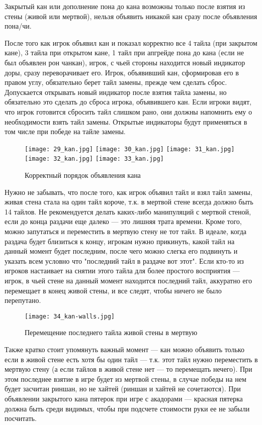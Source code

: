 Закрытый кан или дополнение пона до кана возможны только после взятия из стены (живой или мертвой), нельзя объявить никакой кан сразу после объявления пона/чи.

После того как игрок объявил кан и показал корректно все 4 тайла (при закрытом кане), 3 тайла при открытом кане, 1 тайл при апгрейде пона до кана (если не был объявлен рон чанкан), игрок, с чьей стороны находится новый индикатор доры, сразу переворачивает его. Игрок, объявивший кан, сформировав его в правом углу, обязательно берет тайл замены, прежде чем сделать сброс. Допускается открывать новый индикатор после взятия тайла замены, но обязательно это сделать до сброса игрока, объявившего кан. Если игроки видят, что игрок готовится сбросить тайл слишком рано, они должны напомнить ему о необходимости взять тайл замены. Открытые индикаторы будут применяться в том числе при победе на тайле замены.

\begin{figure}[H]
	\centering
	\texttt{[image: 29\_kan.jpg]}
	\texttt{[image: 30\_kan.jpg]}
	\texttt{[image: 31\_kan.jpg]}
	\texttt{[image: 32\_kan.jpg]}
	\texttt{[image: 33\_kan.jpg]}
	\caption{Корректный порядок объявления кана}
\end{figure}

Нужно не забывать, что после того, как игрок объявил тайл и взял тайл замены, живая стена стала на один тайл короче, т.к. в мертвой стене всегда должно быть 14 тайлов. Не рекомендуется делать каких-либо манипуляций с мертвой стеной, если до конца раздачи еще далеко --- это лишняя трата времени. Кроме того, можно запутаться и переместить в мертвую стену не тот тайл. В идеале, когда раздача будет близиться к концу, игрокам нужно прикинуть, какой тайл на данный момент будет последним, после чего можно слегка его подвинуть и указать всем условно что "последний тайл в раздаче вот этот". Если кто-то из игроков настаивает на снятии этого тайла для более простого восприятия --- игрок, в чьей стене на данный момент находится последний тайл, аккуратно его перемещает в конец живой стены, и все следят, чтобы ничего не было перепутано.

\begin{figure}[H]
	\centering
	\texttt{[image: 34\_kan-walls.jpg]}
	\caption{Перемещение последнего тайла живой стены в мертвую}
\end{figure}

Также кратко стоит упомянуть важный момент --- кан можно объявить только если в живой стене есть хотя бы один тайл --- т.к. этот тайл нужно переместить в мертвую стену (а если тайлов в живой стене нет --- то перемещать нечего). При этом последнее взятие в игре будет из мертвой стены, в случае победы на нем будет засчитан риншан, но не хайтей (риншан и хайтей не сочетаются). При объявлении закрытого кана пятерок при игре с акадорами --- красная пятерка должна быть среди видимых, чтобы при подсчете стоимости руки ее не забыли посчитать.

